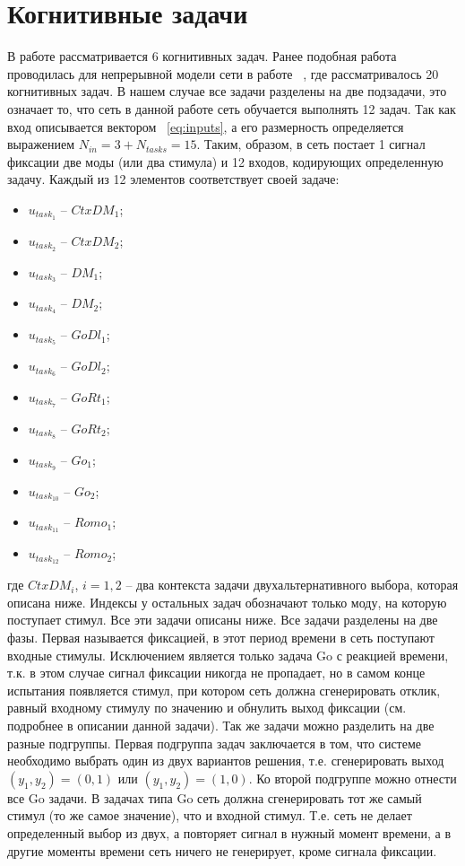 \documentclass{article}
\begin{document}
\newpage


\section{Когнитивные задачи}
В работе рассматривается 6 когнитивных задач. Ранее подобная работа проводилась для непрерывной модели сети в работе ~\cite{yang2019task}, где рассматривалось 20 когнитивных задач. В нашем случае все задачи разделены на две подзадачи, это означает то, что сеть в данной работе сеть обучается выполнять 12 задач. Так как вход описывается вектором ~\ref{eq:inputs}, а его размерность определяется выражением $N_{in} = 3 + N_{tasks} = 15$. Таким, образом, в сеть постает 1 сигнал фиксации две моды (или два стимула) и 12 входов, кодирующих определенную задачу. Каждый из 12 элементов соответствует своей задаче:
\begin{itemize}
  \item $u_{task_1}$ -- $CtxDM_1$;
  \item $u_{task_2}$ -- $CtxDM_2$;
  \item $u_{task_3}$ -- $DM_1$;
  \item $u_{task_4}$ -- $DM_2$;
  \item $u_{task_5}$ -- $GoDl_1$;
  \item $u_{task_6}$ -- $GoDl_2$;
  \item $u_{task_7}$ -- $GoRt_1$;
  \item $u_{task_8}$ -- $GoRt_2$;
  \item $u_{task_9}$ -- $Go_1$;
  \item $u_{task_{10}}$ -- $Go_2$;
  \item $u_{task_{11}}$ -- $Romo_1$;
  \item $u_{task_{12}}$ -- $Romo_2$;
\end{itemize}
где $CtxDM_i$, $i=1,2$ -- два контекста задачи двухальтернативного выбора, которая описана ниже. Индексы у остальных задач обозначают только моду, на которую поступает стимул. Все эти задачи описаны ниже. Все задачи разделены на две фазы. Первая называется фиксацией, в этот период времени в сеть поступают входные стимулы. Исключением является только задача Go с реакцией времени, т.к. в этом случае сигнал фиксации никогда не пропадает, но в самом конце испытания появляется стимул, при котором сеть должна сгенерировать отклик, равный входному стимулу по значению и обнулить выход фиксации (см. подробнее в описании данной задачи). Так же задачи можно разделить на две разные подгруппы. Первая подгруппа задач заключается в том, что системе необходимо выбрать один из двух вариантов решения, т.е. сгенерировать выход $(y_1, y_2) = (0, 1)$ или $(y_1, y_2) = (1, 0)$. Ко второй подгруппе можно отнести все Go задачи. В задачах типа Go сеть должна сгенерировать тот же самый стимул (то же самое значение), что и входной стимул. Т.е. сеть не делает определенный выбор из двух, а повторяет сигнал в нужный момент времени, а в другие моменты времени сеть ничего не генерирует, кроме сигнала фиксации.
\end{document}
